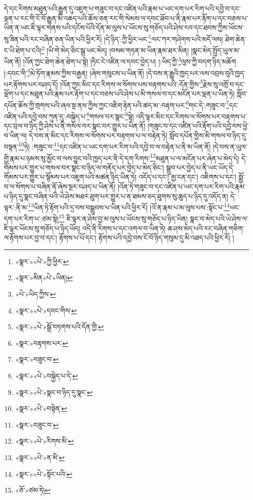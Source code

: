 དེ་དང་རིགས་མཐུན་པའི་རྒྱུན་དུ་འཇུག་པ་གཟུང་བ་དང་འཛིན་པའི་རྣམ་པ་ཡང་དག་པར་རིག་པའི་དབྱེ་བ་དང་ལྡན་པ་རང་གི་ངོ་བོ་རྒྱུན་མི་འཆད་པའི་ཆོས་ཅན་རང་གི་སེམས་ལ་དབང་ཐོབ་པ་ནི་རྣམ་པར་རྟོག་པ་དང་བཅས་པ་ཡིན་ན་ཡང་ཇི་ལྟར་གནས་པའི་དངོས་པོའི་དོན་མ་ལུས་པ་ཡོངས་སུ་གཅོད་པའི་ཤེས་རབ་དང་ཐབས་ཀྱིས་ཡོངས་སུ་ཟིན་པའི་རང་བཞིན་ཅན་ཡིན་པའི་ཕྱིར་རོ། །དེ་ཉིད་:ཀྱི་ཕྱིར་ཡང་\footnote{«སྣར་»«པེ་»ཀྱི་ཕྱིར་}ལང་ཀར་གཤེགས་པའི་མདོ་ལས། ཐེག་ཆེན་ང་ཡི་ཐེག་པ་ངའི།\footnote{«སྣར་»མིན«པེ་»ཡིན།} །ཡི་གེ་མེད་ཅིང་སྒྲ་ཡང་མེད། །བསམ་གཏན་མ་ཡིན་རྣམ་ཐར་མིན། །སྣང་མེད་སྤྱོད་ཡུལ་མ་ཡིན་ནོ། །འོན་ཀྱང་ཐེག་ཆེན་ཐེག་པ་སྟེ། །ཏིང་ངེ་འཛིན་ལ་དབང་བྱེད་པ། །:ཡིད་ཀྱི་\footnote{«པེ་»ཡིད་ཀྱིས་}ལུས་ཀྱི་བདག་ཉིད་མཆོག །:དབང་གི་\footnote{«སྣར་»«པེ་»དབང་གིས་}མེ་ཏོག་རྣམས་ཀྱིས་བརྒྱན། །ཞེས་གསུངས་པ་ཡིན་ནོ། །དེ་བས་ན་རྒྱུའི་ཁྱད་པར་ལས་འབྲས་བུའི་ཁྱད་པར་རྟོགས་པར་བཤད་དོ། །འོན་ཀྱང་མིང་དང་རིགས་ལ་སོགས་པས་བརྟགས་པའི་:དོན་གྱིས་\footnote{«སྣར་»«པེ་»སྒྲོ་བཏགས་པའི་དོན་གྱི་}རྗེས་སུ་འགྲོ་བ་དང་ལྡོག་པ་དང་མཐུན་པའི་རྣམ་པར་རྟོག་པ་དང་བཅས་པའི་ཤེས་པ་མི་གསལ་བ་དང་མངོན་པར་ལྡན་པ་ཡིན་ཏེ། སློབ་དཔོན་ཆོས་ཀྱི་གྲགས་པའི་ཞལ་སྔ་ནས་ཀྱིས་ཀྱང་འཇིག་རྟེན་པའི་ཚད་མ་:བརྟག་པར་\footnote{«སྣར་»བརྟགས་པར་}གང་དེ་:གཟུང་བ་\footnote{«སྣར་»བཟུང་བ་}དང་འཛིན་པའི་དབྱེ་བས་ཀུན་དུ་:བསྐྱེད་པ་\footnote{«སྣར་»«པེ་»བསྐྱེད་པ་དེ་}གསལ་བར་སྣང་\footnote{«སྣར་»«པེ་»སྣང་བ་ཉིད་དུ་སྣང་}སྟེ། འདི་ལྟར་མིང་དང་རིགས་ལ་སོགས་པར་བརྟགས་པ་དང་བྲལ་བ་ཉིད་ཀྱི་ཤེས་པ་ནི་གསལ་བར་སྣང་བར་གྱུར་པ་ཡིན་ནོ། །གཟུང་བ་དང་འཛིན་པའི་རྟོག་པའི་དབྱེ་བས་ཕྱེ་བ་ཡིན་ལ། དེ་བས་ན་མིང་དང་རིགས་ལ་སོགས་པར་བརྟགས་པ་ལ་བརྟེན་ཏེ། སློབ་དཔོན་གྱིས་མི་གསལ་བ་ཉིད་དུ་བསྟན་\footnote{«སྣར་»«པེ་»བསྟེན་}ཏེ། :གཟུང་བ་\footnote{«སྣར་»བཟུང་བ་}དང་འཛིན་པ་ཡང་དག་པར་རིག་པའི་དབྱེ་བ་ལ་བརྟེན་པ་ནི་མ་ཡིན་ནོ། །དེ་བས་ན་ཡུལ་གྱི་རྣམ་པ་ཉམས་སུ་མྱོང་བ་ལས་བྱུང་བའི་ཁྱད་པར་ནི་དེ་དག་རིགས་\footnote{«སྣར་»«པེ་»རིགས་མི་}མཐུན་པ་ལ་མངོན་པར་ཞེན་པ་མེད་དེ། དེ་གོམས་པར་གྱུར་པ་གསལ་བར་སྣང་བ་ཉིད་ལ་གནོད་པར་བྱེད་པ་མེད་ཅིང་། སྒྲུབ་པར་བྱེད་པ་ནི་ཡང་ཡོད་དེ་གོམས་པར་གྱུར་པ་སྙོམས་པར་འཇུག་པའི་མཚན་ཉིད་ཡིན་ཏེ། འདོད་པ་དང་། མྱ་ངན་དང་། འཇིགས་པ་དང་། སྨྱོ་བ་ལ་སོགས་པ་བཞིན་ནོ་ཞེས་སྔར་བཤད་པ་ཡིན་ནོ། །འོན་ཏེ་གཟུང་བ་དང་འཛིན་པ་ཡང་དག་པར་རིག་པའི་རྣམ་པ་ཉིད་དུ་སྣང་བཞིན་པའི་ཡེ་ཤེས་མཐར་ཐུག་པར་གྱུར་པ་ན་ཐམས་ཅད་ཐུགས་སུ་ཆུད་པ་ཉིད་དུ་འདོད་ན། དེ་ལྟར་:ནི་མ་\footnote{«སྣར་»«པེ་»ན་མི་}ཡིན་ཏེ་རྟོག་པའི་དྲ་བས་བསྒྲུབས་པ་ཡིན་པའི་ཕྱིར་རོ། །འོ་ན་རྣམ་པ་མ་ལུས་པས་:སྟོང་པ་\footnote{«སྣར་»«པེ་»སྟོང་པའི་}ཡང་དག་པར་རིག་པ་:ཙམ་སྟེ།\footnote{«ཅོ་»ཙམ་ཏེ།} ཇི་ལྟར་ན་ཤེས་བྱ་མ་ལུས་པ་ཡོངས་སུ་གཅོད་པ་ཉིད་ཡིན། སྣང་བ་མེད་པའི་ཡེ་ཤེས་ལ་ཇི་ལྟར་ཡོངས་སུ་གཅོད་པ་ཉིད་ཡོད། འདི་ནི་རིགས་པ་དང་འགལ་བ་ཡིན་ཏེ། ཆ་ཤས་མེད་པའི་རང་བཞིན་གཅིག་ལ་རྟོགས་པར་བྱ་བ་དང་། རྟོགས་པ་པོ་དང་། རྟོགས་པའི་དབྱེ་བས་ངོ་བོ་ཉིད་གསུམ་དུ་མི་འཐད་པའི་ཕྱིར་རོ། །
